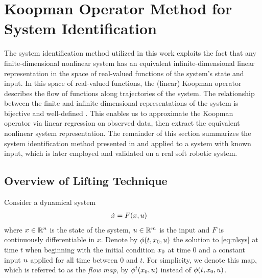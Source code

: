 \section{Koopman Operator Method for System Identification}
\label{sec:theory}

The system identification method utilized in this work exploits the fact that any finite-dimensional nonlinear system has an equivalent infinite-dimensional linear representation in the space of real-valued functions of the system's state and input.
In this space of real-valued functions, the (linear) Koopman operator describes the flow of functions along trajectories of the system.
The relationship between the finite and infinite dimensional representations of the system is bijective and well-defined \cite{lasota2013chaos}.
This enables us to approximate the Koopman operator via linear regression on observed data, then extract the equivalent nonlinear system representation.
The remainder of this section summarizes the system identification method presented in \cite{mauroy2016linear} and \cite{mauroy2017koopman} applied to a system with known input, which is later employed and validated on a real soft robotic system.


\subsection{Overview of Lifting Technique}

Consider a dynamical system
\begin{align}
    \dot{x} &= F(x,u)    \label{eq:nlsys}
\end{align}
where $x \in \mathbb{R}^n$ is the state of the system, $u \in \mathbb{R}^m$ is the input and ${F}$ is continuously differentiable in $x$.
Denote by $\phi(t,x_0,u)$ the solution to \eqref{eq:nlsys} at time $t$ when beginning with the initial condition $x_0$ at time $0$ and a constant input $u$ applied for all time between $0$ and $t$.
For simplicity, we denote this map, which is referred to as the \emph{flow map}, by $\phi^t (x_0, u)$ instead of $\phi (t, x_0, u)$.

